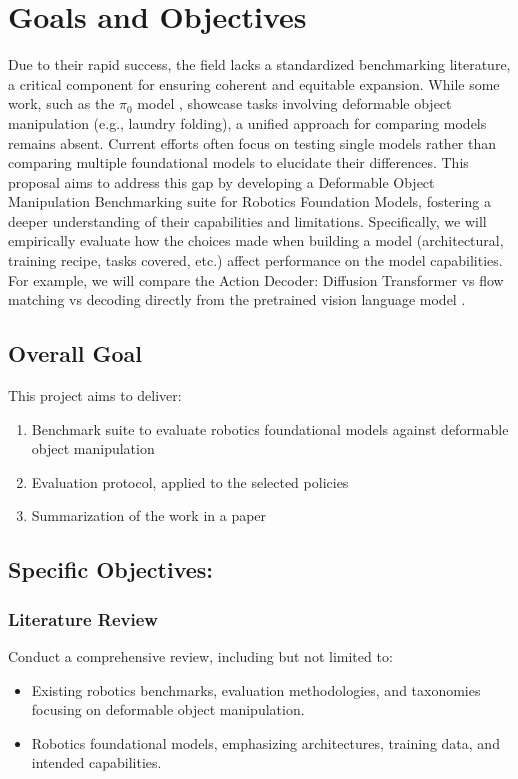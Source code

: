 \section{Goals and Objectives}
Due to their rapid success, the field lacks a standardized benchmarking literature, a critical component for ensuring coherent and equitable expansion. While some work, such as the $\pi_0$ model \cite{pi_zero}, showcase tasks involving deformable object manipulation (e.g., laundry folding), a unified approach for comparing models remains absent. Current efforts often focus on testing single models rather than comparing multiple foundational models to elucidate their differences. This proposal aims to address this gap by developing a Deformable Object Manipulation Benchmarking suite for Robotics Foundation Models, fostering a deeper understanding of their capabilities and limitations. Specifically, we will empirically evaluate how the choices made when building a model (architectural, training recipe, tasks covered, etc.) affect performance on the model capabilities. For example, we will compare the Action Decoder: Diffusion Transformer \cite{Gr00tN1} vs flow matching \cite{pi_zero} vs decoding directly from the pretrained vision language model \cite{OpenVLA}.

\subsection{Overall Goal}

This project aims to deliver:

    \begin{enumerate}[leftmargin=*]
        \item Benchmark suite to evaluate robotics foundational models against deformable object manipulation
        \item Evaluation protocol, applied to the selected policies 
        \item Summarization of the work in a paper
    \end{enumerate}


\subsection{Specific Objectives:}
    \subsubsection{Literature Review}
        Conduct a comprehensive review, including but not limited to:
        \begin{itemize}
            \item Existing robotics benchmarks, evaluation methodologies, and taxonomies focusing on deformable object manipulation.
            \item Robotics foundational models, emphasizing architectures, training data, and intended capabilities.
        \end{itemize}
